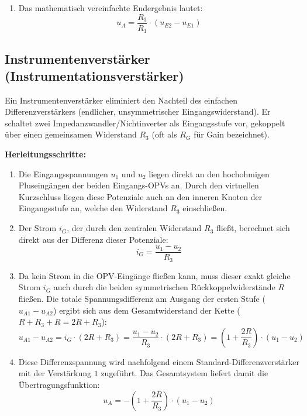 \documentclass[11pt,a4paper]{article}
\begin{document}
\begin{enumerate}
    \begin{equation}
    \frac{R_4}{R_2 + R_4} \cdot \left( \frac{R_1 + R_3}{R_1} \right) = \frac{R_4 \cdot (R_1 + R_3)}{R_1 \cdot (R_2 + R_4)} = \frac{R_4 R_1 + R_4 R_3}{R_1 R_2 + R_1 R_4}
    \end{equation}
    Ersetzen von $R_1 R_4$ im Nenner durch $R_3 R_2$:
    \begin{equation}
    \frac{R_4 R_1 + R_4 R_3}{R_1 R_2 + R_3 R_2} = \frac{R_4 \cdot (R_1 + R_3)}{R_2 \cdot (R_1 + R_3)} = \frac{R_4}{R_2} = \frac{R_3}{R_1}
    \end{equation}
    \item Das mathematisch vereinfachte Endergebnis lautet:
    \begin{equation}
    u_A = \frac{R_3}{R_1} \cdot (u_{E2} - u_{E1})
    \end{equation}
\end{enumerate}

\subsection{Instrumentenverstärker (Instrumentationsverstärker)}
Ein Instrumentenverstärker eliminiert den Nachteil des einfachen Differenzverstärkers (endlicher, unsymmetrischer Eingangswiderstand). Er schaltet zwei Impedanzwandler/Nichtinverter als Eingangsstufe vor, gekoppelt über einen gemeinsamen Widerstand $R_3$ (oft als $R_G$ für Gain bezeichnet).

\textbf{Herleitungsschritte:}
\begin{enumerate}
    \item Die Eingangsspannungen $u_1$ und $u_2$ liegen direkt an den hochohmigen Pluseingängen der beiden Eingangs-OPVs an. Durch den virtuellen Kurzschluss liegen diese Potenziale auch an den inneren Knoten der Eingangsstufe an, welche den Widerstand $R_3$ einschließen.
    \item Der Strom $i_G$, der durch den zentralen Widerstand $R_3$ fließt, berechnet sich direkt aus der Differenz dieser Potenziale:
    \begin{equation}
    i_G = \frac{u_1 - u_2}{R_3}
    \end{equation}
    \item Da kein Strom in die OPV-Eingänge fließen kann, muss dieser exakt gleiche Strom $i_G$ auch durch die beiden symmetrischen Rückkoppelwiderstände $R$ fließen. Die totale Spannungsdifferenz am Ausgang der ersten Stufe ($u_{A1} - u_{A2}$) ergibt sich aus dem Gesamtwiderstand der Kette ($R + R_3 + R = 2R + R_3$):
    \begin{equation}
    u_{A1} - u_{A2} = i_G \cdot (2R + R_3) = \frac{u_1 - u_2}{R_3} \cdot (2R + R_3) = \left( 1 + \frac{2R}{R_3} \right) \cdot (u_1 - u_2)
    \end{equation}
    \item Diese Differenzspannung wird nachfolgend einem Standard-Differenzverstärker mit der Verstärkung $1$ zugeführt. Das Gesamtsystem liefert damit die Übertragungsfunktion:
    \begin{equation}
    u_A = -\left( 1 + \frac{2R}{R_3} \right) \cdot (u_1 - u_2)
    \end{equation}
\end{enumerate}
\end{document}
